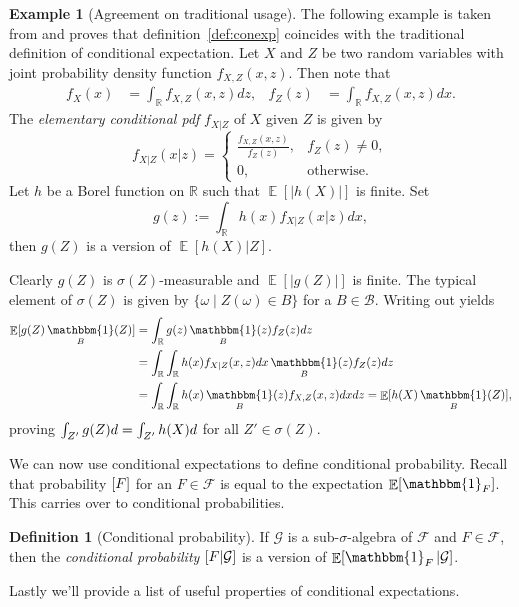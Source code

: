 \documentclass[twoside,a4paper]{article}
\theoremstyle{plain}
\theoremstyle{definition}
\newtheorem{definition}[theorem]{Definition}
\newtheorem{example}[theorem]{Example}
\theoremstyle{remark}
\numberwithin{equation}{section}
\newcommand{\R}{\mathbb{R}}
\let\P\relax
\DeclareMathOperator{\P}{\mathbb{P}}
\DeclareMathOperator{\E}{\mathbb{E}}
\DeclareMathOperator{\1}{\mathbbm{1}}
\newcommand{\F}{\mathcal{F}}
\renewcommand{\G}{\mathcal{G}}
\newcommand{\B}{\mathcal{B}}
\begin{document}
\begin{example}[Agreement on traditional usage]
The following example is taken from \cite{Williams91} and proves that definition~\ref{def:conexp} coincides with the traditional definition of conditional expectation. Let $X$ and $Z$ be two random variables with joint probability density function $f_{X,Z}(x,z)$. Then note that \begin{align*}
f_X(x)&=\int_\R f_{X,Z}(x,z)dz,&f_Z(z)&=\int_\R f_{X,Z}(x,z)dx.
\end{align*}
The \emph{elementary conditional pdf} $f_{X|Z}$ of $X$ given $Z$ is given by 
\[f_{X|Z}(x|z)=\begin{cases}\frac{f_{X,Z}(x,z)}{f_Z(z)},&f_Z(z)\neq 0,\\0,&\mathrm{otherwise.}\end{cases}\]
Let $h$ be a Borel function on $\R$ such that $\E[|h(X)|]$ is finite. Set \[g(z):=\int_\R h(x)f_{X|Z}(x|z)dx,\] then $g(Z)$ is a version of $\E[h(X)|Z]$.

Clearly $g(Z)$ is $\sigma(Z)$-measurable and $\E[|g(Z)|]$ is finite. The typical element of $\sigma(Z)$ is given by $\{\omega\mid Z(\omega)\in B\}$ for a $B\in\B$. Writing out yields
\begin{align*}
\E[g(Z)\1_B(Z)]&=\int_\R g(z)\1_B(z)f_Z(z)dz\\
&=\int_\R \int_\R h(x)f_{X|Z}(x,z)dx\1_B(z)f_Z(z)dz\\
&=\int_{\R}\int_\R h(x)\1_B(z)f_{X,Z}(x,z)dxdz=\E[h(X)\1_B(Z)],
\end{align*}
proving $\int_{Z'} g(Z)d\P=\int_{Z'} h(X)d\P$ for all $Z'\in\sigma(Z)$.
\end{example}
We can now use conditional expectations to define conditional probability. Recall that probability $\P[F]$ for an $F\in\F$ is equal to the expectation $\E[\1_F]$. This carries over to conditional probabilities.
\begin{definition}[Conditional probability]
If $\G$ is a sub-$\sigma$-algebra of $\F$ and $F\in\F$, then the \emph{conditional probability} $\P[F|\G]$ is a version of $\E[\1_F|\G]$.
\end{definition}
Lastly we'll provide a list of useful properties of conditional expectations.
\end{document}
